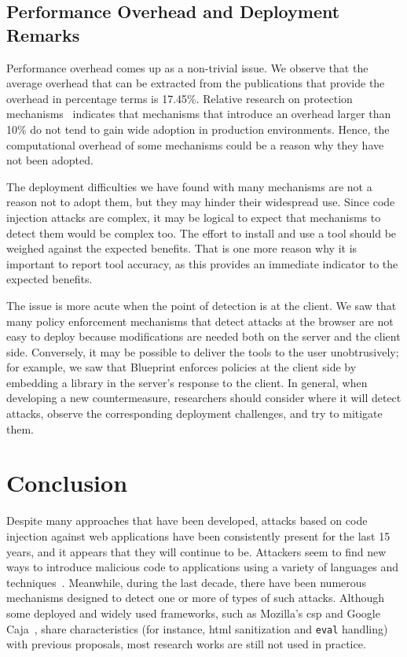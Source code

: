 \documentclass[conference]{IEEEtran}
\begin{document}
\subsection{Performance Overhead and Deployment Remarks}

Performance overhead comes up as a non-trivial issue. We observe
that the average overhead that can be extracted from the publications
that provide the overhead in percentage terms is 17.45\%. Relative
research on protection mechanisms~\cite{SPWS13} indicates that
mechanisms that introduce an overhead larger than 10\% do not tend to
gain wide adoption in production environments. Hence, the
computational overhead of some mechanisms could be a reason why they
have not been adopted.

The deployment difficulties we have found with many mechanisms are not
a reason not to adopt them, but they may hinder their widespread use.
Since code injection attacks are complex, it may be logical to
expect that mechanisms to detect them would be complex too. The effort
to install and use a tool should be weighed against the expected
benefits. That is one more reason why it is important to report tool
accuracy, as this provides an immediate indicator to the expected
benefits. 

The issue is more acute when the point of detection is at the client.
We saw that many policy enforcement mechanisms that detect attacks at
the browser are not easy to deploy because modifications are needed
both on the server and the client side.
Conversely, it may be possible to deliver
the tools to the user unobtrusively; for example, we saw that
Blueprint enforces policies at the client side by embedding a library
in the server's response to the client. In general, when developing a
new countermeasure, researchers should consider where it
will detect attacks, observe the corresponding deployment
challenges, and try to mitigate them.

\section{Conclusion}
\label{sec:conclusion}

Despite many approaches that have been developed,
attacks based on code injection against web applications
have been consistently present for the last 15 years,
and it appears that they will continue to be.
Attackers seem to find new ways to introduce
malicious code to applications using a
variety of languages and techniques~\cite{HNSHS12,DKH14}.
Meanwhile, during the last decade, there have been
numerous mechanisms designed to
detect one or more of types of such attacks.
Although some deployed and widely used frameworks, 
such as Mozilla's {\sc csp} and Google Caja~\cite{M06,caja},
share characteristics
(for instance, {\sc html} sanitization and {\tt eval} handling)
with previous proposals, 
most research works are still not used in practice.
\end{document}
